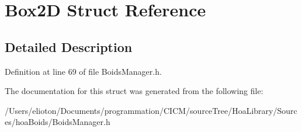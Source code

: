 \hypertarget{struct_box2_d}{\section{Box2\-D Struct Reference}
\label{struct_box2_d}
}


\subsection{Detailed Description}


Definition at line 69 of file Boids\-Manager.\-h.



The documentation for this struct was generated from the following file\-:\begin{DoxyCompactItemize}
\item 
/\-Users/elioton/\-Documents/programmation/\-C\-I\-C\-M/source\-Tree/\-Hoa\-Library/\-Sources/hoa\-Boids/Boids\-Manager.\-h\end{DoxyCompactItemize}
